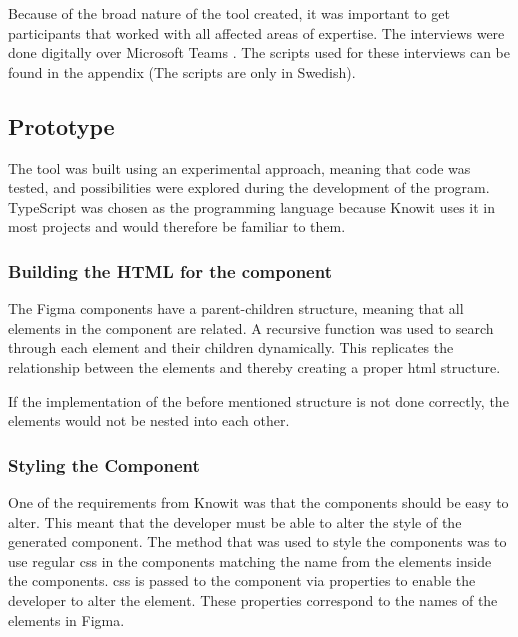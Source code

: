Because of the broad nature of the tool created, it was important to get participants that worked with all affected areas of expertise. The interviews were done digitally over Microsoft Teams \cite{VideoConferencingMeetings}. The scripts used for these interviews can be found in the appendix (The scripts are only in Swedish). 

\subsection{Prototype}%
\label{sub:Mprototype}

The tool was built using an experimental approach, meaning that code was tested, and possibilities were explored during the development of the program. TypeScript was chosen as the programming language because Knowit uses it in most projects and would therefore be familiar to them.

\subsubsection{Building the HTML for the component}%
\label{ssub:building the skeleton of the component}
The Figma \glspl{component} have a parent-children structure, meaning that all \glspl{element} in the \gls{component} are related. A recursive function was used to search through each \gls{element} and their children dynamically. This replicates the relationship between the \glspl{element} and thereby creating a proper \acrshort{html} structure.

If the implementation of the before mentioned structure is not done correctly, the \glspl{element} would not be nested into each other.


\subsubsection{Styling the Component}%
\label{ssub:Styling the component}
One of the requirements from Knowit was that the \glspl{component} should be easy to alter. This meant that the developer must be able to alter the style of the generated \gls{component}. The method that was used to style the components was to use regular \acrshort{css} in the components matching the name from the elements inside the components. \acrshort{css} is passed to the component via properties to enable the developer to alter the element. These properties correspond to the names of the elements in Figma. 

